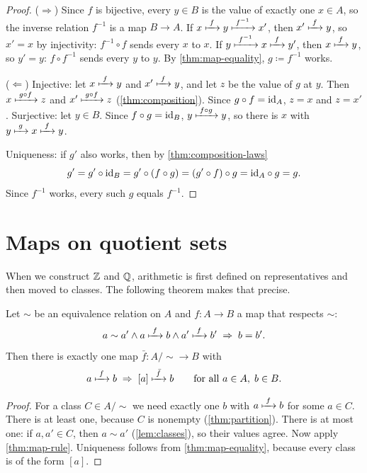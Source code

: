 \begin{proof}
($\Rightarrow$) Since $f$ is bijective, every $y \in B$ is the value of exactly one
$x \in A$, so the inverse relation $f^{-1}$ is a map $B \to A$. If $x \xmapsto{\;f\;} y
\xmapsto{\;f^{-1}\;} x'$, then $x' \xmapsto{\;f\;} y$, so $x' = x$ by injectivity: $f^{-1} \circ f$
sends every $x$ to $x$. If $y \xmapsto{\;f^{-1}\;} x \xmapsto{\;f\;} y'$, then $x \xmapsto{\;f\;} y$, so $y'
= y$: $f \circ f^{-1}$ sends every $y$ to $y$. By \cref{thm:map-equality}, $g
\coloneqq f^{-1}$ works.

($\Leftarrow$) Injective: let $x \xmapsto{\;f\;} y$ and $x' \xmapsto{\;f\;} y$, and let $z$ be the
value of $g$ at $y$. Then $x \xmapsto{\;g \circ f\;} z$ and $x' \xmapsto{\;g \circ f\;} z$
(\cref{thm:composition}). Since $g \circ f = \mathrm{id}_A$, $z = x$ and $z = x'$.
Surjective: let $y \in B$. Since $f \circ g = \mathrm{id}_B$, $y \xmapsto{\;f \circ g\;} y$, so
there is $x$ with $y \xmapsto{\;g\;} x \xmapsto{\;f\;} y$.

Uniqueness: if $g'$ also works, then by \cref{thm:composition-laws}
\[
  g' = g' \circ \mathrm{id}_B = g' \circ (f \circ g) = (g' \circ f) \circ g = \mathrm{id}_A \circ
  g = g.
\]
Since $f^{-1}$ works, every such $g$ equals $f^{-1}$.
\end{proof}

\section{Maps on quotient sets}

When we construct $\mathbb{Z}$ and $\mathbb{Q}$, arithmetic is first defined on representatives
and then moved to classes. The following theorem makes that precise.

\begin{theorem}
\label{thm:quotient-map}
Let $\sim$ be an equivalence relation on $A$ and $f \colon A \to B$ a map that
respects $\sim$:
\[
  a \sim a' \land a \xmapsto{\;f\;} b \land a' \xmapsto{\;f\;} b' \;\Rightarrow\; b = b'.
\]
Then there is exactly one map $\bar f \colon A/{\sim} \to B$ with
\[
  a \xmapsto{\;f\;} b \;\Rightarrow\; [a] \xmapsto{\;\bar f\;} b \qquad \text{for all } a \in A,\;
  b \in B.
\]
\end{theorem}

\begin{proof}
For a class $C \in A/{\sim}$ we need exactly one $b$ with $a \xmapsto{\;f\;} b$ for some $a
\in C$. There is at least one, because $C$ is nonempty (\cref{thm:partition}).
There is at most one: if $a, a' \in C$, then $a \sim a'$ (\cref{lem:classes}), so
their values agree. Now apply \cref{thm:map-rule}. Uniqueness follows from
\cref{thm:map-equality}, because every class is of the form $[a]$.
\end{proof}

